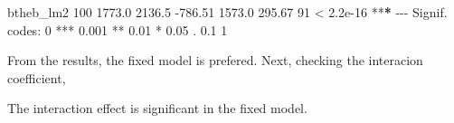 \documentclass[
]{article}
\newenvironment{Shaded}{\begin{snugshade}}{\end{snugshade}}
\newcommand{\DecValTok}[1]{\textcolor[rgb]{0.00,0.00,0.81}{#1}}
\newcommand{\ErrorTok}[1]{\textcolor[rgb]{0.64,0.00,0.00}{\textbf{#1}}}
\newcommand{\FloatTok}[1]{\textcolor[rgb]{0.00,0.00,0.81}{#1}}
\newcommand{\FunctionTok}[1]{\textcolor[rgb]{0.00,0.00,0.00}{#1}}
\newcommand{\NormalTok}[1]{#1}
\newcommand{\SpecialCharTok}[1]{\textcolor[rgb]{0.00,0.00,0.00}{#1}}
\newcommand{\StringTok}[1]{\textcolor[rgb]{0.31,0.60,0.02}{#1}}
\begin{document}
\begin{Shaded}
\begin{Highlighting}[]
\NormalTok{btheb\_lm2    }\DecValTok{100} \FloatTok{1773.0} \FloatTok{2136.5} \SpecialCharTok{{-}}\FloatTok{786.51}   \FloatTok{1573.0} \FloatTok{295.67} \DecValTok{91}  \SpecialCharTok{\textless{}} \FloatTok{2.2e{-}16} \SpecialCharTok{**}\ErrorTok{*}
\SpecialCharTok{{-}{-}{-}}
\NormalTok{Signif. codes}\SpecialCharTok{:}  \DecValTok{0} \StringTok{\textquotesingle{}***\textquotesingle{}} \FloatTok{0.001} \StringTok{\textquotesingle{}**\textquotesingle{}} \FloatTok{0.01} \StringTok{\textquotesingle{}*\textquotesingle{}} \FloatTok{0.05} \StringTok{\textquotesingle{}.\textquotesingle{}} \FloatTok{0.1} \StringTok{\textquotesingle{} \textquotesingle{}} \DecValTok{1}
\end{Highlighting}
\end{Shaded}

From the results, the fixed model is prefered. Next, checking the
interacion coefficient,

\begin{Shaded}
\end{Shaded}

The interaction effect is significant in the fixed model.
\end{document}
